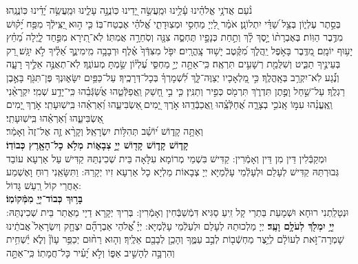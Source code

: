 \documentclass[twoside, openany, parskip=half, 11pt]{book}
\begin{document}
 
 נֹ֨עַם אֲדֹנָ֥י אֱלֹהֵ֗ינוּ עָ֫לֵ֥ינוּ וּמַֽעֲשֵׂ֣ה יָ֭דֵינוּ כּֽוֹנֲנָ֣ה עָלֵ֑ינוּ וּמַֽעֲשֵׂ֥ה יָ֝דֵ֗ינוּ כּֽוֹנֲנֵֽהוּ׃\\
 
 בְּסֵ֣תֶר עֶלְי֑וֹן בְּצֵ֥ל שַׁ֝דַּ֗י יִתְלוֹנָֽן׃
אֹמַ֗ר לַ֭יְיָ מַחְסִ֣י וּמְצֽוּדָתִ֑י אֱ֝לֹהַ֗י אֶבְטַח־בּֽוֹ׃ 
כִּ֤י ה֣וּא יַ֭צִּֽילְֿךָ מִפַּ֥ח יָ֝ק֗וּשׁ מִדֶּ֥בֶר הַוּֽוֹת׃ 
בְּאֶבְרָת֨וֹ יָ֣סֶךְ לָ֗ךְ וְתַ֣חַת כְּנָפָ֣יו תֶּחְסֶ֑ה צִנָּ֖ה וְסֹֽחֵרָ֣ה אֲמִתּֽוֹ׃ 
לֹֽא־תִ֭ירָא מִפַּ֣חַד לָ֑יְלָה מֵ֝חֵ֗ץ יָע֥וּף יוֹמָֽם׃ 
מִ֭דֶּֽבֶר בָּאֹ֣פֶל יַֽהֲלֹ֑ךְ מִ֝קֶּ֗טֶב יָשׁ֥וּד צָֽהֳרָֽיִם׃ 
יִפֹּ֤ל מִצִּדְּֿךָ֙ אֶ֗לֶף וּרְבָבָ֥ה מִֽימִינֶ֑ךָ אֵ֝לֶ֗יךָ לֹ֣א יִגָּֽשׁ׃ 
רַ֭ק בְּעֵינֶ֣יךָ תַבִּ֑יט וְשִׁלֻּמַ֖ת רְשָׁעִ֣ים תִּרְאֶֽה׃ 
כִּֽי־אַתָּ֣ה יְיָ֣ מַחְסִּ֑י עֶ֝לְי֗וֹן שַׂ֣מְתָּ מְעוֹנֶֽךָ׃ 
לֹֽא־תְאֻנֶּ֣ה אֵלֶ֣יךָ רָעָ֑ה וְנֶ֗֝גַע לֹֽא־יִקְרַ֥ב בְּאָֽהֳלֶֽךָ׃ 
כִּ֣י מַ֭לְאָכָיו יְצַוֶּה־לָּ֑ךְ לִ֝שְׁמָרְךָ֗ בְּכָל־דְּרָכֶֽיךָ׃ 
עַל־כַּפַּ֥יִם יִשָּׂא֑וּנְךָ פֶּן־תִּגֹּ֖ף בָּאֶ֣בֶן רַגְלֶֽךָ׃ 
עַל־שַׁ֣חַל וָפֶ֣תֶן תִּדְרֹ֑ךְ תִּרְמֹ֖ס כְּפִ֣יר וְתַנִּֽין׃ 
כִּ֤י בִ֣י חָ֭שַׁק וַֽאֲפַלְּֿטֵ֑הוּ אֲשַׂ֝גְּֿבֵ֗הוּ כִּֽי־יָדַ֥ע שְׁמִֽי׃ 
יִקְרָאֵ֨נִי וְֽאֶֽעֱנֵ֗הוּ עִמּ֣וֹ אָֽנֹכִ֣י בְצָרָ֑ה אֲ֝חַלְּֿצֵֽ֗הוּ וַֽאֲכַבְּֿדֵֽהוּ׃ 
אֹ֣רֶךְ יָ֭מִים ֖אַשְׂבִּיעֵ֑הוּ וְ֝אַרְאֵ֗הוּ בִּֽישֽׁוּעָתִֽי׃
אֹ֣רֶךְ יָ֭מִים ֖אַשְׂבִּיעֵ֑הוּ וְ֝אַרְאֵ֗הוּ בִּֽישֽׁוּעָתִֽי׃\\
 \label{v ata kadosh}
  וְאַתָּ֥ה
 קָד֑וֹשׁ י֝וֹשֵׁ֗ב תְּהִלּ֥וֹת יִשְׂרָאֵֽל׃
  וְקָרָ֨א זֶ֤ה אֶל־זֶה֙ וְאָמַ֔ר׃\\
\textbf{קָד֧וֹשׁ קָד֛וֹשׁ קָד֖וֹשׁ יְיָ֣ צְבָא֑וֹת מְלֹ֥א כָל־הָאָ֖רֶץ כְּבוֹדֽוֹ׃}\\
 וּמְקַבְּֿלִין דֵּין מִן דֵּין וְאָמְֿרִין: קַדִּישׁ בִּשְׁמֵי מְרוֹמָא עִלָּאָה בֵּית שְׁכִינְתֵּהּ קַדִּישׁ עַל אַרְעָא עוֹבַד גְּבוּרְתֵּהּ קַדִּישׁ לְעָלַם וּלְעָלְֿמֵי עָלְֿמַיָּא יְיָ צְבָאוֹת מַלְיָא כָל אַרְעָא זִיו יְקָרֵהּ:  וַתִּשָּׂאֵֽנִי 
 רֽוּחַ וָאֶשְׁמַע אַחֲרַי קוֹל רַֽעַשׁ גָּדוֹל:\\ 
\textbf{בָּר֥וּךְ כְּבוֹד־יְיָ֖ מִמְּֿקוֹמֽוֹ׃}\\
וּנְטָלַֽתְנִי רוּחָא וּשְׁמָעֵת בַּתְרַי קָל זִֽיעַ סַגִּיא דִּמְֿשַׁבְּֿחִין וְאָמְֿרִין: בְּרִיךְ יְקָרָא דַיָי מֵאֲתַר בֵּית שְׁכִינְתֵּהּ: 
\textbf{יְיָ֥ יִמְלֹ֖ךְ לְעֹלָ֥ם וָעֶֽד׃} 
 יְיָ מַלְכוּתֵהּ לְעָלַם וּלְעַלְֿמֵי עָלְֿמְיָּא: יְיָ֗
  אֱ֠לֹהֵי אַבְרָהָ֞ם יִצְחָ֤ק וְיִשְׂרָאֵל֙ אֲבֹתֵ֔ינוּ שָׁמְרָה־זֹּ֣את לְעוֹלָ֔ם לְיֵ֥צֶר מַחְשְֿׁב֖וֹת לְבַ֣ב עַמֶּ֑ךָ וְהָכֵ֥ן לְבָבָ֖ם אֵלֶֽיךָ׃ וְה֤וּא
   רַח֨וּם יְכַפֵּ֥ר עָוֹן֘ וְלֹ֢א יַ֫שְׁחִ֥ית וְהִרְבָּ֣ה לְהָשִׁ֣יב אַפּ֑וֹ וְלֹ֣א יָ֝עִ֗יר כָּל־חֲמָתֽוֹ׃ כִּֽי־אַתָּ֣ה
\end{document}
